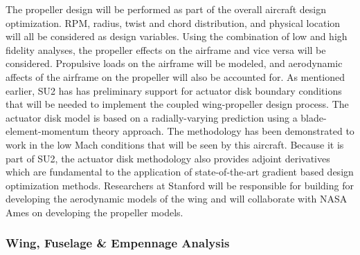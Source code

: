 \documentclass[]{aiaa-tc}
\begin{document}
    The propeller design will be performed as part of the overall aircraft design optimization. RPM, radius, twist and chord distribution, and 
    physical location will all be considered as design variables. Using the combination of low and high fidelity analyses, the propeller 
    effects on the airframe and vice versa will be considered. Propulsive loads on the airframe will be modeled, and aerodynamic affects of the
    airframe on the propeller will also be accounted for. As mentioned earlier, SU2 has has preliminary support for actuator 
    disk boundary conditions that will be needed to implement the coupled wing­-propeller design process. The actuator disk model is based on a radially-varying prediction using a blade-element-momentum theory approach. The methodology has been demonstrated to work in the low 
    Mach conditions that will be seen by this aircraft. Because it is part of SU2, the actuator disk methodology also provides adjoint derivatives 
    which are fundamental to the application of state-of-the-art gradient based design optimization methods. Researchers at Stanford will be responsible for building for developing the aerodynamic models of the wing and will collaborate with NASA Ames on developing the 
    propeller models. 

    \subsubsection{Wing, Fuselage \& Empennage Analysis}
    
\end{document}
